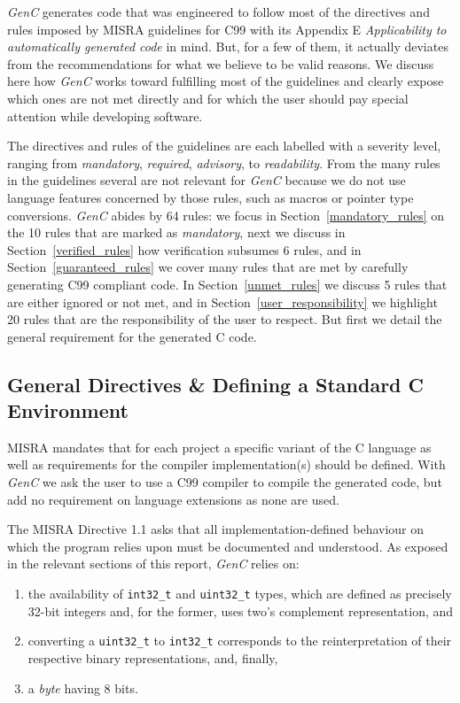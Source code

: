 \documentclass[a4paper,twoside]{article}
\newcommand{\InlineC}[1]{\lstinline[language=C99]|#1|}
\newcommand{\GenC}{\emph{GenC}\xspace}
\newcommand{\RefSec}[1]{Section~\ref{#1}}
\begin{document}
\GenC generates code that was engineered to follow most of the directives and
rules imposed by MISRA guidelines for C99 with its Appendix E
\emph{Applicability to automatically generated code} in mind. But, for a few of
them, it actually deviates from the recommendations for what we believe to be
valid reasons. We discuss here how \GenC works toward fulfilling most of the
guidelines and clearly expose which ones are not met directly and for which the
user should pay special attention while developing software.

The directives and rules of the guidelines are each labelled with a severity
level, ranging from \emph{mandatory}, \emph{required}, \emph{advisory}, to
\emph{readability}. From the many rules in the guidelines several are not
relevant for \GenC because we do not use language features concerned by those
rules, such as macros or pointer type conversions. \GenC abides by 64 rules: we
focus in \RefSec{mandatory_rules} on the 10 rules that are marked as
\emph{mandatory}, next we discuss in \RefSec{verified_rules} how verification
subsumes 6 rules, and in \RefSec{guaranteed_rules} we cover many rules that are
met by carefully generating C99 compliant code. In \RefSec{unmet_rules} we
discuss 5 rules that are either ignored or not met, and in
\RefSec{user_responsibility} we highlight 20 rules that are the responsibility
of the user to respect. But first we detail the general requirement for the
generated C code.


\subsection{General Directives \& Defining a Standard C Environment}

MISRA mandates that for each project a specific variant of the C language as
well as requirements for the compiler implementation(s) should be defined. With
\GenC we ask the user to use a C99 compiler to compile the generated code, but
add no requirement on language extensions as none are used.

The MISRA Directive 1.1 asks that all implementation-defined behaviour on which
the program relies upon must be documented and understood. As exposed in the
relevant sections of this report, \GenC relies on:

\begin{enumerate}

\item the availability of \InlineC{int32_t} and \InlineC{uint32_t} types, which
are defined as precisely 32-bit integers and, for the former, uses two's
complement representation, and

\item converting a \InlineC{uint32_t} to \InlineC{int32_t} corresponds to the
reinterpretation of their respective binary representations, and, finally,

\item a \emph{byte} having 8 bits.

\end{enumerate}
\end{document}
